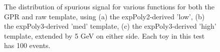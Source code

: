 \begin{figure} 
\begin{center}

\caption{The distribution of spurious signal for various functions for both the GPR and raw template, using (a) the expPoly2-derived 'low', (b) the expPoly3-derived 'med' template, (c) the expPoly3-derived 'high' template, extended by 5 GeV on either side. Each toy in this test has 100 events.}
\label{fig:padded_lowpt_100_noSig}
\end{center}
\end{figure}

